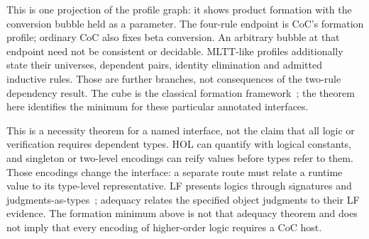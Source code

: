 \documentclass[11pt,a4paper]{article}
\theoremstyle{plain}
\theoremstyle{definition}
\theoremstyle{remark}
\begin{document}
\begin{center}
\end{center}
This is one projection of the profile graph: it shows product formation with
the conversion bubble held as a parameter. The four-rule endpoint is CoC's
formation profile; ordinary CoC also fixes beta conversion. An arbitrary
bubble at that endpoint need not be consistent or decidable. MLTT-like
profiles additionally state their universes, dependent pairs, identity
elimination and admitted inductive rules. Those are further branches, not
consequences of the two-rule dependency result. The cube is the classical
formation framework~\cite{BarendregtCube}; the theorem here identifies the
minimum for these particular annotated interfaces.

This is a necessity theorem for a named interface, not the claim that all
logic or verification requires dependent types. HOL can quantify with logical
constants, and singleton or two-level encodings can reify values before types
refer to them. Those encodings change the interface: a separate route must
relate a runtime value to its type-level representative. LF presents logics
through signatures and judgments-as-types~\cite{HarperHonsellPlotkin};
adequacy relates the specified object judgments to their LF evidence. The
formation minimum above is not that adequacy theorem and does not imply
that every encoding of higher-order logic requires a CoC host.
\end{document}
